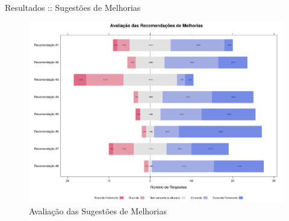 \documentclass[t,14pt,mathserif]{beamer}
\begin{document}
\begin{frame}{Resultados :: Sugestões de Melhorias}

    \begin{figure}[htpb]
        \centering
        \includegraphics[width=.9\linewidth]{../img/plot_likert_avaliacao_sug_melhorias.pdf}
        \caption{Avaliação das Sugestões de Melhorias}
\label{fig:plot_likert_avaliacao_sug_melhorias}
    \end{figure}

\end{frame}
\end{document}
